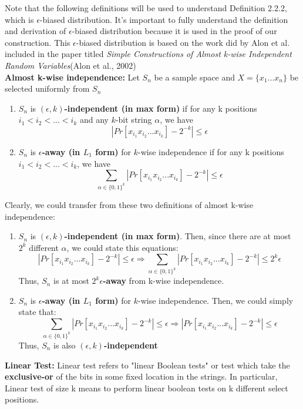 \documentclass[a4paper, english]{paper}
\begin{document}
Note that the following definitions will be used to understand Definition 2.2.2, which is $\epsilon$-biased distribution. It's important to fully understand the definition and derivation of $\epsilon$-biased distribution because it is used in the proof of our construction. This $\epsilon$-biased distribution is based on the work did by Alon et al. included in the paper titled \textit{Simple Constructions of Almost k-wise Independent Random Variables}(Alon et al., 2002)\\

	\noindent\textbf{Almost k-wise independence:}
	Let $S_n$ be a sample space and $X=\{x_1...x_n\}$ be selected uniformly from $S_n$
	\begin{enumerate}
	\item $S_n$ is  \textbf{$(\epsilon,k)$-independent (in max form)} if for any k positions $i_1<i_2<...<i_k$ and any $k$-bit string $\alpha$, we have
		$$|Pr[x_{i_1}x_{i_2}...x_{i_k}]-2^{-k}|\le \epsilon$$
	\item $S_n$ is \textbf{$\epsilon$-away (in $L_1$ form)} for $k$-wise independence if for any k positions $i_1<i_2<...<i_k$, we have
		$$\sum_{\alpha\in\{0,1\}^k}|Pr[x_{i_1}x_{i_2}...x_{i_k}]-2^{-k}| \le \epsilon$$
	\end{enumerate}
	\quad Clearly, we could transfer from these two definitions of almost k-wise independence:
	\begin{enumerate}
	\item $S_n$ is  \textbf{$(\epsilon,k)$-independent (in max form)}. Then, since there are at most $2^k$ different $\alpha$, we could state this equations:
$$|Pr[x_{i_1}x_{i_2}...x_{i_k}]-2^{-k}|\le \epsilon \Rightarrow \sum_{\alpha\in\{0,1\}^k}|Pr[x_{i_1}x_{i_2}...x_{i_k}]-2^{-k}| \le 2^k\epsilon$$
	Thus, $S_n$ is at most \textbf{$2^k\epsilon$-away} from k-wise independence.
	\item $S_n$ is \textbf{$\epsilon$-away (in $L_1$ form)} for $k$-wise independence. Then, we could simply state that:
$$\sum_{\alpha\in\{0,1\}^k}|Pr[x_{i_1}x_{i_2}...x_{i_k}]-2^{-k}| \le \epsilon \Rightarrow |Pr[x_{i_1}x_{i_2}...x_{i_k}]-2^{-k}|\le \epsilon $$
	Thus, $S_n$ is also \textbf{$(\epsilon,k)$-independent}
	\end{enumerate}
		
	\noindent\textbf{Linear Test:} Linear test refers to "linear Boolean tests" or test which take the \textbf{exclusive-or} of the bits in some fixed location in the strings. In particular, Linear test of size k means to perform linear boolean tests on k different select positions.\\
\end{document}
